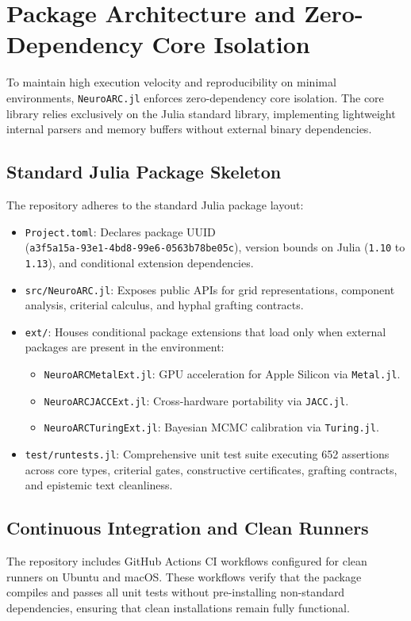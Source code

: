\section{Package Architecture and Zero-Dependency Core Isolation}

To maintain high execution velocity and reproducibility on minimal environments, \texttt{NeuroARC.jl} enforces zero-dependency core isolation. The core library relies exclusively on the Julia standard library, implementing lightweight internal parsers and memory buffers without external binary dependencies.

\subsection{Standard Julia Package Skeleton}
The repository adheres to the standard Julia package layout:
\begin{itemize}
  \item \texttt{Project.toml}: Declares package UUID\\
  (\texttt{a3f5a15a-93e1-4bd8-99e6-0563b78be05c}), version bounds on Julia (\texttt{1.10} to \texttt{1.13}), and conditional extension dependencies.
  \item \texttt{src/NeuroARC.jl}: Exposes public APIs for grid representations, component analysis, criterial calculus, and hyphal grafting contracts.
  \item \texttt{ext/}: Houses conditional package extensions that load only when external packages are present in the environment:
  \begin{itemize}
    \item \texttt{NeuroARCMetalExt.jl}: GPU acceleration for Apple Silicon via \texttt{Metal.jl}.
    \item \texttt{NeuroARCJACCExt.jl}: Cross-hardware portability via \texttt{JACC.jl}.
    \item \texttt{NeuroARCTuringExt.jl}: Bayesian MCMC calibration via \texttt{Turing.jl}.
  \end{itemize}
  \item \texttt{test/runtests.jl}: Comprehensive unit test suite executing 652 assertions across core types, criterial gates, constructive certificates, grafting contracts, and epistemic text cleanliness.
\end{itemize}

\subsection{Continuous Integration and Clean Runners}
The repository includes GitHub Actions CI workflows configured for clean runners on Ubuntu and macOS. These workflows verify that the package compiles and passes all unit tests without pre-installing non-standard dependencies, ensuring that clean installations remain fully functional.

